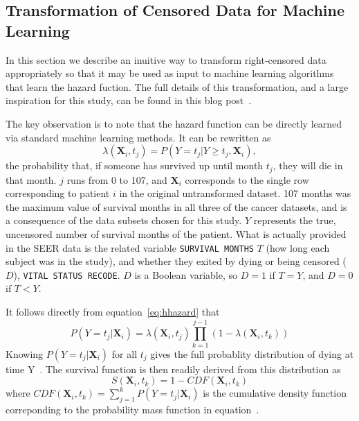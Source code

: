 \documentclass[10pt,letterpaper]{article}
\newcommand{\codewhite}[1]{\colorbox{white}{\texttt{#1}}}
\begin{document}
\subsection*{Transformation of Censored Data for Machine Learning}
\label{subsec:transformation}

In this section we describe an inuitive way to transform right-censored data appropriately so that it may be used as input to machine learning algorithms that learn the hazard fuction. The full details of this transformation, and a large inspiration for this study, can be found in this blog post~\cite{kuhn}.


The key observation is to note that the hazard function can be directly learned via standard machine learning methods. It can be rewritten as
\begin{equation}
\label{eq:hhazard}
\lambda(\mathbf{X}_{i}, t_{j}) = P(Y = t_{j}|Y \geq t_{j}, \mathbf{X}_{i}),
\end{equation}
the probability that, if someone has survived up until month $t_{j}$, they will die in that month.
 $j$ runs from 0 to 107, and $\mathbf{X}_{i}$ corresponds to the single row corresponding to patient $i$ in the original untransformed dataset.
107 months was the maximum value of survival months in all three of the cancer datasets, and is a consequence of the data subsets chosen for this study.
$Y$ represents the true, uncensored number of survival months of the patient.
What is actually provided in the SEER data is the related variable \codewhite{SURVIVAL MONTHS} $T$ (how long each subject was in the study), and whether they exited by dying or being censored ($D$), \codewhite{VITAL STATUS RECODE}. 
$D$ is a Boolean variable, so $D = 1$ if $T = Y$, and $D = 0$ if $T < Y$.



It follows directly from equation~\ref{eq:hhazard} that 
\begin{equation}
\label{eq:pmf}
P(Y = t_{j} | \mathbf{X}_{i}) = \lambda(\mathbf{X}_{i}, t_{j}) \prod_{k=1}^{j-1} (1 - \lambda(\mathbf{X}_{i}, t_{k}))
\end{equation}
Knowing $P(Y = t_{j} | \mathbf{X}_{i}) $ for all $t_{j}$ gives the 
full probablity distribution of dying at time Y~\cite{kuhn}.
The survival function is then readily derived from this distribution as
\begin{equation}
\label{eq:cdf}
S(\mathbf{X}_{i},t_{k}) = 1 - CDF(\mathbf{X}_{i}, t_{k})
\end{equation}
where $CDF(\mathbf{X}_{i}, t_{k}) = \sum_
{j=1}^{k} P(Y = t_{j} | \mathbf{X}_{i}) $ is the cumulative density function correponding to the probability mass function in equation~\cite{downey}.
\end{document}
